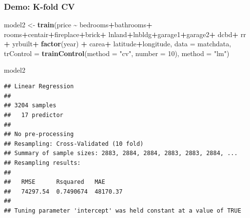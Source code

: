 \documentclass[
  shownotes,
  xcolor={svgnames},
  hyperref={colorlinks,citecolor=DarkBlue,linkcolor=DarkRed,urlcolor=DarkBlue}
  ]{beamer}
\newenvironment{Shaded}{\begin{snugshade}}{\end{snugshade}}
\newcommand{\DataTypeTok}[1]{\textcolor[rgb]{0.13,0.29,0.53}{#1}}
\newcommand{\DecValTok}[1]{\textcolor[rgb]{0.00,0.00,0.81}{#1}}
\newcommand{\KeywordTok}[1]{\textcolor[rgb]{0.13,0.29,0.53}{\textbf{#1}}}
\newcommand{\NormalTok}[1]{#1}
\newcommand{\OperatorTok}[1]{\textcolor[rgb]{0.81,0.36,0.00}{\textbf{#1}}}
\newcommand{\StringTok}[1]{\textcolor[rgb]{0.31,0.60,0.02}{#1}}
\begin{document}
\begin{frame}[fragile]
\frametitle{Demo: K-fold CV}

\begin{scriptsize}
\begin{Shaded}
\begin{Highlighting}[]
\NormalTok{model2 \textless{}{-}}\StringTok{ }\KeywordTok{train}\NormalTok{(price }\OperatorTok{\textasciitilde{}}\StringTok{ }\NormalTok{bedrooms}\OperatorTok{+}\NormalTok{bathrooms}\OperatorTok{+}\StringTok{ }\NormalTok{rooms}\OperatorTok{+}\NormalTok{centair}\OperatorTok{+}\NormalTok{fireplace}\OperatorTok{+}\NormalTok{brick}\OperatorTok{+}
\StringTok{                        }\NormalTok{lnland}\OperatorTok{+}\NormalTok{lnbldg}\OperatorTok{+}\NormalTok{garage1}\OperatorTok{+}\NormalTok{garage2}\OperatorTok{+}
\StringTok{                        }\NormalTok{dcbd}\OperatorTok{+}\StringTok{ }\NormalTok{rr }\OperatorTok{+}
\StringTok{                        }\NormalTok{yrbuilt}\OperatorTok{+}\StringTok{ }\KeywordTok{factor}\NormalTok{(year) }\OperatorTok{+}
\StringTok{                        }\NormalTok{carea}\OperatorTok{+}\StringTok{ }\NormalTok{latitude}\OperatorTok{+}\NormalTok{longitude,}
                        \DataTypeTok{data =}\NormalTok{ matchdata,                        }
                        \DataTypeTok{trControl =} \KeywordTok{trainControl}\NormalTok{(}\DataTypeTok{method =} \StringTok{"cv"}\NormalTok{, }\DataTypeTok{number =} \DecValTok{10}\NormalTok{), }
                        \DataTypeTok{method =} \StringTok{"lm"}\NormalTok{)}
 
\NormalTok{model2}
\end{Highlighting}
\end{Shaded}
\end{scriptsize}
\begin{tiny}
\begin{verbatim}
## Linear Regression 
## 
## 3204 samples
##   17 predictor
## 
## No pre-processing
## Resampling: Cross-Validated (10 fold) 
## Summary of sample sizes: 2883, 2884, 2884, 2883, 2883, 2884, ... 
## Resampling results:
## 
##   RMSE      Rsquared   MAE     
##   74297.54  0.7490674  48170.37
## 
## Tuning parameter 'intercept' was held constant at a value of TRUE
\end{verbatim}
\end{tiny}

\end{frame}
\end{document}
